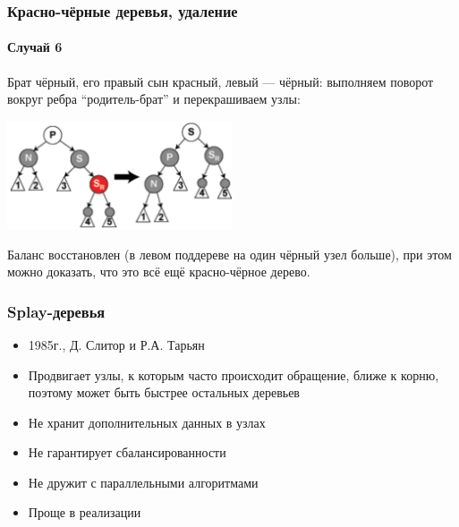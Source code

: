 \documentclass[xetex,mathserif,serif]{beamer}
\begin{document}
	\begin{frame}
		\frametitle{Красно-чёрные деревья, удаление}
		\framesubtitle{Случай 6}
		Брат чёрный, его правый сын красный, левый --- чёрный: выполняем поворот вокруг ребра ``родитель-брат'' и перекрашиваем узлы:
		\begin{center}
			\includegraphics[width=0.5\textwidth]{redBlackRemoval5.png}
		\end{center}
		Баланс восстановлен (в левом поддереве на один чёрный узел больше), при этом можно доказать, что это всё ещё красно-чёрное дерево.
	\end{frame}

	\begin{frame}
		\frametitle{Splay-деревья}
		\begin{itemize}
			\item 1985г., Д. Слитор и Р.А. Тарьян
			\item Продвигает узлы, к которым часто происходит обращение, ближе к корню, поэтому может быть быстрее остальных деревьев
			\item Не хранит дополнительных данных в узлах
			\item Не гарантирует сбалансированности
			\item Не дружит с параллельными алгоритмами
			\item Проще в реализации
		\end{itemize}
	\end{frame}
\end{document}
